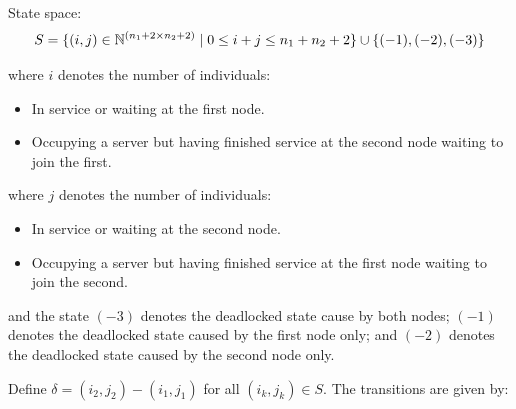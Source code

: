 \documentclass{article}
\numberwithin{equation}{section}
\begin{document}
State space:
    \[S = \{(i,j)\in\mathbb{N}^{(n_1+2\times n_2+2)} \nonscript\; | \nonscript\; 0 \leq i + j \leq n_1 + n_2 + 2
    \}\cup\{(-1), (-2), (-3)\}\]

    where \(i\) denotes the number of individuals:
        \begin{itemize}
            \item In service or waiting at the first node.
            \item Occupying a server but having finished service at the
                second node waiting to join the first.
        \end{itemize}
    where \(j\) denotes the number of individuals:
        \begin{itemize}
            \item In service or waiting at the second node.
            \item Occupying a server but having finished service at the
                first node waiting to join the second.
        \end{itemize}
    and the state $(-3)$ denotes the deadlocked state cause by both nodes; $(-1)$ denotes the deadlocked state caused by the first node only; and $(-2)$ denotes the deadlocked state caused by the second node only.

Define $\delta = (i_2, j_2) - (i_1, j_1)$ for all $(i_k, j_k) \in S$. The transitions are given by:
\end{document}
